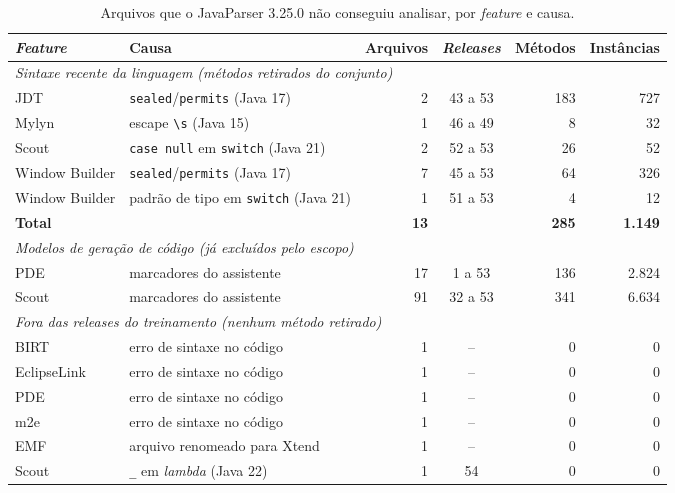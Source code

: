 \begin{table}[htbp]
    \centering
    \footnotesize
    \caption{Arquivos que o JavaParser 3.25.0 não conseguiu analisar, por \textit{feature} e causa.}
    \label{tab:ap-falhas-parsing}
    \begin{tabular}{llrcrr}
        \toprule
        \textit{Feature} & Causa & Arquivos & \textit{Releases} & Métodos & Instâncias \\
        \midrule
        \multicolumn{6}{l}{\textit{Sintaxe recente da linguagem (métodos retirados do conjunto)}} \\
        JDT            & \texttt{sealed}/\texttt{permits} (Java 17)      &  2 & 43 a 53 & 183 &   727 \\
        Mylyn          & escape \texttt{\textbackslash s} (Java 15)      &  1 & 46 a 49 &   8 &    32 \\
        Scout          & \texttt{case null} em \texttt{switch} (Java 21) &  2 & 52 a 53 &  26 &    52 \\
        Window Builder & \texttt{sealed}/\texttt{permits} (Java 17)      &  7 & 45 a 53 &  64 &   326 \\
        Window Builder & padrão de tipo em \texttt{switch} (Java 21)     &  1 & 51 a 53 &   4 &    12 \\
        \textbf{Total} &                                                 & \textbf{13} & & \textbf{285} & \textbf{1.149} \\
        \midrule
        \multicolumn{6}{l}{\textit{Modelos de geração de código (já excluídos pelo escopo)}} \\
        PDE            & marcadores do assistente                        & 17 & 1 a 53  & 136 & 2.824 \\
        Scout          & marcadores do assistente                        & 91 & 32 a 53 & 341 & 6.634 \\
        \midrule
        \multicolumn{6}{l}{\textit{Fora das releases do treinamento (nenhum método retirado)}} \\
        BIRT           & erro de sintaxe no código                       &  1 & --     &   0 &     0 \\
        EclipseLink    & erro de sintaxe no código                       &  1 & --     &   0 &     0 \\
        PDE            & erro de sintaxe no código                       &  1 & --     &   0 &     0 \\
        m2e            & erro de sintaxe no código                       &  1 & --     &   0 &     0 \\
        EMF            & arquivo renomeado para Xtend                    &  1 & --     &   0 &     0 \\
        Scout          & \texttt{\_} em \textit{lambda} (Java 22)        &  1 & 54     &   0 &     0 \\
        \bottomrule
    \end{tabular}
\end{table}%
